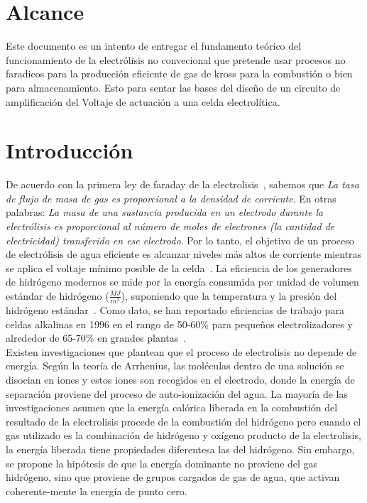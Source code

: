 \documentclass[12pt,twoside,onecolumn]{article}
\begin{document}
 
 
\newpage 
\section{Alcance}
Este documento es un intento de entregar el fundamento teórico del funcionamiento de la electr\'olisis no convecional que pretende usar procesos no faradicos para la producci\'on eficiente de gas de kross para la combusti\'on o bien para almacenamiento. Esto para sentar las bases del dise\~no de un circuito de amplificaci\'on del Voltaje de actuaci\'on a una celda electrol\'itica.

\section{Introducción}
De acuerdo con la primera ley de faraday de la electrolisis~\cite{1954JChEd}, sabemos que \textit{La tasa de flujo de masa de gas es proporcional a la densidad de corriente}. En otras palabras: \textit{La masa de una sustancia producida en un electrodo durante la electrólisis es proporcional al número de moles de electrones (la cantidad de electricidad) transferido en ese electrodo}. Por lo tanto, el objetivo de un proceso de electrólisis de agua eficiente es alcanzar niveles más altos de corriente mientras se aplica el voltaje mínimo posible de la celda~\cite{kavehinvestiagtion}. La eficiencia de los generadores de hidrógeno modernos se mide por la energía consumida por unidad de volumen estándar de hidrógeno ($\frac{MJ}{m^3}$), suponiendo que la temperatura y la presión del hidrógeno estándar~\cite{h2vol}. Como dato, se han reportado eficiencias de trabajo para celdas alkalinas en 1996 en el rango de 50-60\% para pequeños electrolizadores y alrededor de 65-70\% en grandes plantas~\cite{eff}.\\

Existen investigaciones que plantean que el proceso de electrolisis no depende de energía. Según la teoría de Arrhenius, las moléculas dentro de una solución se disocian en iones y estos iones son recogidos en el electrodo\cite{dublin}, donde la energía de separación proviene del proceso de auto-ionización del agua. La mayoría de las investigaciones asumen que la energía calórica liberada en la combustión del resultado de la electrolisis procede de la combustión del hidrógeno pero cuando el gas utilizado es la combinación de hidrógeno y oxígeno producto de la electrolisis, la energía liberada tiene propiedades diferentesa las del hidrógeno. Sin embargo, se propone la hipótesis de que la energía dominante no proviene del gas hidrógeno, sino que proviene de grupos cargados de gas de agua, que activan coherente-mente la energía de punto cero.\cite{king2011water}
\end{document}

